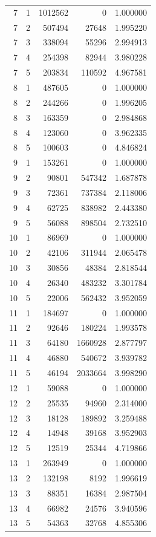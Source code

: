 \begin{longtable}{rrrrr}
7 & 1 & 1012562 & 0 & 1.000000 \\
7 & 2 & 507494 & 27648 & 1.995220 \\
7 & 3 & 338094 & 55296 & 2.994913 \\
7 & 4 & 254398 & 82944 & 3.980228 \\
7 & 5 & 203834 & 110592 & 4.967581 \\
8 & 1 & 487605 & 0 & 1.000000 \\
8 & 2 & 244266 & 0 & 1.996205 \\
8 & 3 & 163359 & 0 & 2.984868 \\
8 & 4 & 123060 & 0 & 3.962335 \\
8 & 5 & 100603 & 0 & 4.846824 \\
9 & 1 & 153261 & 0 & 1.000000 \\
9 & 2 & 90801 & 547342 & 1.687878 \\
9 & 3 & 72361 & 737384 & 2.118006 \\
9 & 4 & 62725 & 838982 & 2.443380 \\
9 & 5 & 56088 & 898504 & 2.732510 \\
10 & 1 & 86969 & 0 & 1.000000 \\
10 & 2 & 42106 & 311944 & 2.065478 \\
10 & 3 & 30856 & 48384 & 2.818544 \\
10 & 4 & 26340 & 483232 & 3.301784 \\
10 & 5 & 22006 & 562432 & 3.952059 \\
11 & 1 & 184697 & 0 & 1.000000 \\
11 & 2 & 92646 & 180224 & 1.993578 \\
11 & 3 & 64180 & 1660928 & 2.877797 \\
11 & 4 & 46880 & 540672 & 3.939782 \\
11 & 5 & 46194 & 2033664 & 3.998290 \\
12 & 1 & 59088 & 0 & 1.000000 \\
12 & 2 & 25535 & 94960 & 2.314000 \\
12 & 3 & 18128 & 189892 & 3.259488 \\
12 & 4 & 14948 & 39168 & 3.952903 \\
12 & 5 & 12519 & 25344 & 4.719866 \\
13 & 1 & 263949 & 0 & 1.000000 \\
13 & 2 & 132198 & 8192 & 1.996619 \\
13 & 3 & 88351 & 16384 & 2.987504 \\
13 & 4 & 66982 & 24576 & 3.940596 \\
13 & 5 & 54363 & 32768 & 4.855306 \\

\end{longtable}
